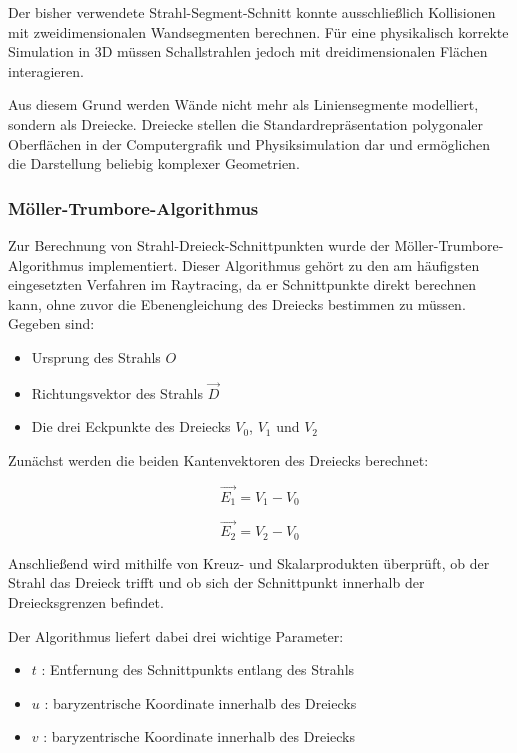 \documentclass{article}
\begin{document}
    Der bisher verwendete Strahl-Segment-Schnitt konnte ausschließlich Kollisionen mit zweidimensionalen Wandsegmenten berechnen. Für eine physikalisch korrekte Simulation in 3D müssen Schallstrahlen jedoch mit dreidimensionalen Flächen interagieren.

    Aus diesem Grund werden Wände nicht mehr als Liniensegmente modelliert, sondern als Dreiecke. Dreiecke stellen die Standardrepräsentation polygonaler Oberflächen in der Computergrafik und Physiksimulation dar und ermöglichen die Darstellung beliebig komplexer Geometrien.

    \newpage
    \subsubsection{Möller-Trumbore-Algorithmus}

    Zur Berechnung von Strahl-Dreieck-Schnittpunkten wurde der Möller-Trumbore-Algorithmus implementiert. Dieser Algorithmus gehört zu den am häufigsten eingesetzten Verfahren im Raytracing, da er Schnittpunkte direkt berechnen kann, ohne zuvor die Ebenengleichung des Dreiecks bestimmen zu müssen.
    Gegeben sind:

    \begin{itemize}
    \item Ursprung des Strahls $O$
    \item Richtungsvektor des Strahls $\vec{D}$
    \item Die drei Eckpunkte des Dreiecks $V_0$, $V_1$ und $V_2$
    \end{itemize}

    Zunächst werden die beiden Kantenvektoren des Dreiecks berechnet:

    \[
    \vec{E_1} = V_1 - V_0
    \]

    \[
    \vec{E_2} = V_2 - V_0
    \]

    Anschließend wird mithilfe von Kreuz- und Skalarprodukten überprüft, ob der Strahl das Dreieck trifft und ob sich der Schnittpunkt innerhalb der Dreiecksgrenzen befindet.

    Der Algorithmus liefert dabei drei wichtige Parameter:

    \begin{itemize}
    \item $t$ : Entfernung des Schnittpunkts entlang des Strahls
    \item $u$ : baryzentrische Koordinate innerhalb des Dreiecks
    \item $v$ : baryzentrische Koordinate innerhalb des Dreiecks
    \end{itemize}
\end{document}
